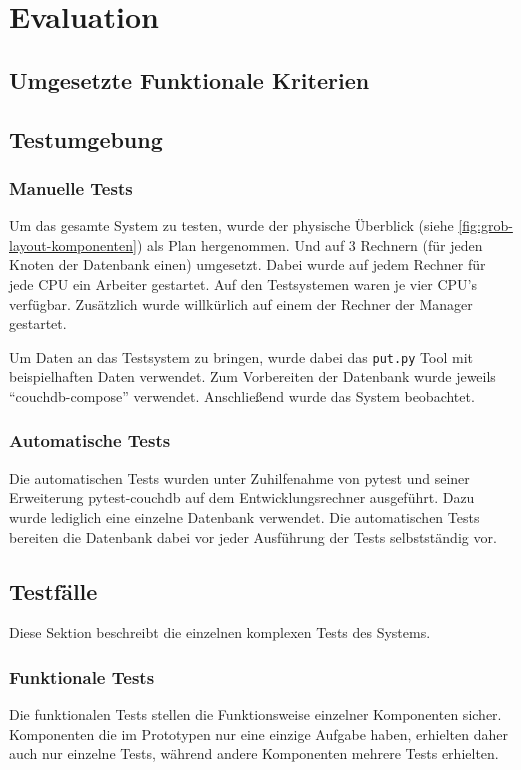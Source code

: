 \chapter{Evaluation}
\section{Umgesetzte Funktionale Kriterien}



\section{Testumgebung}


\subsection{Manuelle Tests}
Um das gesamte System zu testen, wurde der physische Überblick (siehe \cref{fig:grob-layout-komponenten}) als Plan hergenommen.
Und auf 3 Rechnern (für jeden Knoten der Datenbank einen) umgesetzt.
Dabei wurde auf jedem Rechner für jede CPU ein Arbeiter gestartet.
Auf den Testsystemen waren je vier CPU's verfügbar.
Zusätzlich wurde willkürlich auf einem der Rechner der Manager gestartet.

Um Daten an das Testsystem zu bringen, wurde dabei das \verb|put.py| Tool mit beispielhaften Daten verwendet.
Zum Vorbereiten der Datenbank wurde jeweils ``couchdb-compose'' \cite{couchdb:compose} verwendet.
Anschließend wurde das System beobachtet.

\subsection{Automatische Tests}
Die automatischen Tests wurden unter Zuhilfenahme von pytest \cite{pytest:website} und seiner Erweiterung  pytest-couchdb \cite{pytest:couchdbkit} auf dem Entwicklungsrechner  ausgeführt.
Dazu wurde lediglich eine einzelne Datenbank verwendet.
Die automatischen Tests bereiten die Datenbank dabei vor jeder Ausführung der Tests selbstständig vor.

\section{Testfälle}


Diese Sektion beschreibt die einzelnen komplexen Tests des Systems.

\subsection{Funktionale Tests}
Die funktionalen Tests stellen die Funktionsweise einzelner Komponenten sicher.
Komponenten die im Prototypen nur eine einzige Aufgabe haben,
erhielten daher auch nur einzelne Tests, während andere Komponenten mehrere Tests erhielten.

